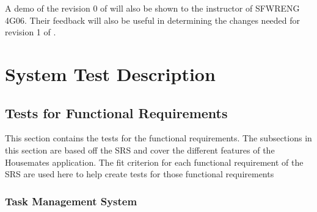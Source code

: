 \documentclass[12pt, titlepage]{article}
\begin{document}
A demo of the revision 0 of \progname{} will also be shown to the instructor of SFWRENG 4G06. Their feedback will also be useful in determining the changes needed for revision 1 of \progname{}.






\section{System Test Description}
	
\subsection{Tests for Functional Requirements}

This section contains the tests for the functional requirements. The subsections in this section are based off the SRS and cover the different features of the Housemates application. The fit criterion for each functional requirement of the SRS are used here to help create tests for those functional requirements



\subsubsection{Task Management System}
\end{document}
